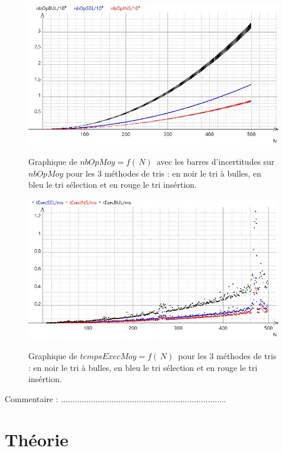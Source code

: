 \documentclass{report}
\begin{document}
\begin{figure}[H]
	\includegraphics[width=\textwidth]{../graphe/nbOp.jpg}
	\label{nbOP1}
	\caption{Graphique de $nbOpMoy=f(\,N)\,$ avec les barres d'incertitudes sur $nbOpMoy$ pour les 3 méthodes de tris : en noir le tri à bulles, en bleu le tri sélection et en rouge le tri insértion.}
\end{figure}
\begin{figure}[H]
	\includegraphics[width=\textwidth]{../graphe/tExecSansU.jpg}
	\label{tExec1}
	\caption{Graphique de $tempsExecMoy=f(\,N)\,$ pour les 3 méthodes de tris : en noir le tri à bulles, en bleu le tri sélection et en rouge le tri insértion.}
\end{figure}

Commentaire : ........................................................................




\chapter{Théorie}
\end{document}
